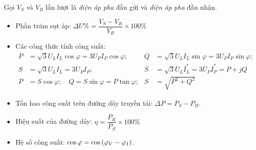 	Gọi $V_S$ và $V_R$ lần lượt là \emph{điện áp pha} đầu gửi và \emph{điện áp pha} đầu nhận.
	\begin{itemize}
		\item Phần trăm sụt áp: $\Delta U \%= \dfrac{V_S - V_R}{V_R} \times 100 \%$

		\item Các công thức tính công suất:
			\begin{align*}
				P & = \sqrt{3}U_{L}I_{L}\cos \varphi = 3U_{P}I_{P}\cos \varphi; &  Q & = \sqrt{3}U_{L}I_{L}\sin \varphi = 3U_{P}I_{P}\sin \varphi;\\
			S & = \sqrt{3}U_{L}I_{L} = 3 U_{P} I_{P}; & \overline{S} & = \sqrt{3}\overline{U}_{L}\overline{I}_{L}^{\ast} = 3\overline{U}_{P}\overline{I}_{P}^{\ast} = P + jQ\\
			P  & = S\cos \varphi; \quad Q  = S\sin \varphi =  P\tan\varphi;  & S & = \sqrt{P^2 + Q^2}
			\end{align*}					
		
		\item Tổn hao công suất trên đường dây truyền tải: $\Delta P = P_S - P_R$.
		
		\item Hiệu suất của đường dây: $\eta = \dfrac{P_R}{P_S} \times 100\%$
		
		\item Hệ số công suất: $\cos \varphi = \cos \left({\varphi_{V} - \varphi_{I}}\right)$.
	\end{itemize}
	

